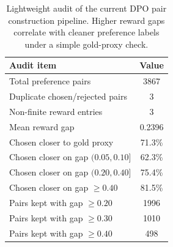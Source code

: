 \begin{table}[t]
\centering
\small
\begin{tabular}{lc}
\toprule
Audit item & Value \\
\midrule
Total preference pairs & 3867 \\
Duplicate chosen/rejected pairs & 3 \\
Non-finite reward entries & 3 \\
Mean reward gap & 0.2396 \\
Chosen closer to gold proxy & 71.3\% \\
Chosen closer on gap $(0.05, 0.10]$ & 62.3\% \\
Chosen closer on gap $(0.20, 0.40]$ & 75.4\% \\
Chosen closer on gap $\geq 0.40$ & 81.5\% \\
Pairs kept with gap $\geq 0.20$ & 1996 \\
Pairs kept with gap $\geq 0.30$ & 1010 \\
Pairs kept with gap $\geq 0.40$ & 498 \\
\bottomrule
\end{tabular}
\caption{Lightweight audit of the current DPO pair construction pipeline. Higher reward gaps correlate with cleaner preference labels under a simple gold-proxy check.}
\label{tab:dpo-audit}
\end{table}
